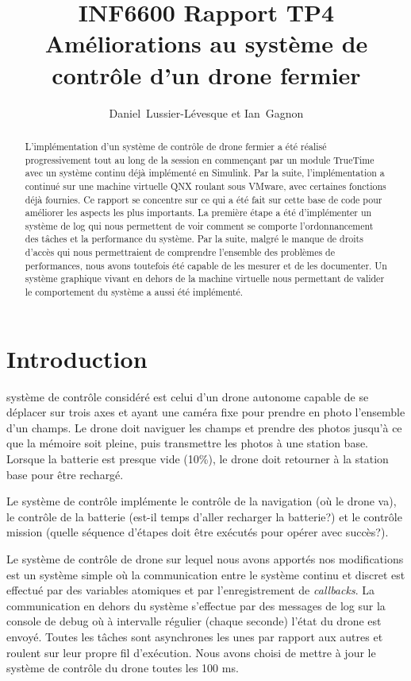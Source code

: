 \documentclass[journal]{IEEEtran}
\begin{document}
\title{INF6600 Rapport TP4 \\ Améliorations au système de contrôle d'un drone fermier}


\author{Daniel~Lussier-Lévesque et Ian~Gagnon}

\maketitle

\begin{abstract}
L'implémentation d'un système de contrôle de drone fermier a été réalisé progressivement tout au long de la session en commençant par un module TrueTime avec un système continu déjà implémenté en Simulink. Par la suite, l'implémentation a continué sur une machine virtuelle QNX roulant sous VMware, avec certaines fonctions déjà fournies. Ce rapport se concentre sur ce qui a été fait sur cette base de code pour améliorer les aspects les plus importants. La première étape a été d'implémenter un système de log qui nous permettent de voir comment se comporte l'ordonnancement des tâches et la performance du système. Par la suite, malgré le manque de droits d'accès qui nous permettraient de comprendre l'ensemble des problèmes de performances, nous avons toutefois été capable de les mesurer et de les documenter. Un système graphique vivant en dehors de la machine virtuelle nous permettant de valider le comportement du système a aussi été implémenté.
\end{abstract}


\section{Introduction}
 système de contrôle considéré est celui d'un drone autonome capable de se déplacer sur trois axes et ayant une caméra fixe pour prendre en photo l'ensemble d'un champs. Le drone doit naviguer les champs et prendre des photos jusqu'à ce que la mémoire soit pleine, puis transmettre les photos à une station base. Lorsque la batterie est presque vide (10\%), le drone doit retourner à la station base pour être rechargé. 

Le système de contrôle implémente le contrôle de la navigation (où le drone va), le contrôle de la batterie (est-il temps d'aller recharger la batterie?) et le contrôle mission (quelle séquence d'étapes doit être exécutés pour opérer avec succès?).

Le système de contrôle de drone sur lequel nous avons apportés nos modifications est un système simple où la communication entre le système continu et discret est effectué par des variables atomiques et par l'enregistrement de \textit{callbacks}. La communication en dehors du système s'effectue par des messages de log sur la console de debug où à intervalle régulier (chaque seconde) l'état du drone est envoyé. Toutes les tâches sont asynchrones les unes par rapport aux autres et roulent sur leur propre fil d'exécution. Nous avons choisi de mettre à jour le système de contrôle du drone toutes les 100 ms.
\end{document}
